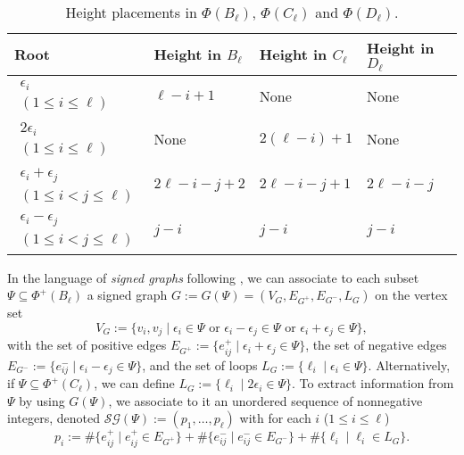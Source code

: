 \documentclass[12pt]{amsart}
\theoremstyle{plain}
\theoremstyle{definition}
\theoremstyle{remark}
\newcommand{\SG}{{\mathcal{SG}}}
\begin{document}
 \begin{table}[htbp]
\centering
{\footnotesize\renewcommand{} 
\begin{tabular}{K{2.5cm}|K{2.5cm}|K{2.5cm}|K{2.5cm}}
Root & Height in $B_\ell$ & Height in $C_\ell$ & Height in $D_\ell$ \\
\hline\hline
$\begin{array}{c}
     \epsilon_i    \\
    (1 \le i \le \ell)
    \end{array}$
& $\ell-i+1$ &None &None \\
\hline
$\begin{array}{c}
     2\epsilon_i    \\
    (1 \le i \le \ell)
    \end{array}$
& None &$2(\ell-i)+1$ &None \\
\hline
$\begin{array}{c}
     \epsilon_i + \epsilon_j\\
    (1 \le i < j \le \ell)
    \end{array}$
& $2\ell-i-j+2$ & $2\ell-i-j+1$ &$2\ell-i-j$ \\
\hline
$\begin{array}{c}
     \epsilon_i - \epsilon_j  \\
    (1 \le i<j \le \ell)
    \end{array}$
& $j-i$ & $j-i$ &$j-i$
\end{tabular}
}
\bigskip
\caption{Height placements in $\Phi(B_\ell)$, $\Phi(C_\ell)$ and $\Phi(D_\ell)$.}
\label{tab:placement}
\end{table}

 
In the language of \emph{signed graphs} following \cite[\S5]{Z81}, we can associate to each subset $\Psi\subseteq\Phi^+(B_\ell)$ a signed graph $G:=G(\Psi)=(V_G, E_{G^+},E_{G^-},L_G)$ on the vertex set 
$$V_G:=\{v_i,v_j \mid \mbox{$\epsilon_i  \in \Psi$ or $\epsilon_i-\epsilon_{j} \in \Psi$ or $\epsilon_i+\epsilon_{j} \in \Psi$} \},$$ with the set of positive edges $E_{G^+}:=\{e_{ij}^+ \mid \epsilon_i + \epsilon_{j} \in \Psi\}$, the set of negative edges $E_{G^-}:=\{e_{ij}^- \mid \epsilon_i - \epsilon_{j} \in \Psi\}$, and the set of loops $L_G:=\{\ell_i \mid \epsilon_i \in \Psi\}$. 
Alternatively, if $\Psi\subseteq\Phi^+(C_\ell)$, we can define $L_G:=\{\ell_i \mid 2\epsilon_i \in \Psi\}$. 
To extract information from $\Psi$ by using $G(\Psi)$, we associate to it an unordered sequence of nonnegative integers, denoted $\SG(\Psi):=(p_1,\ldots,p_\ell)$ with for each $i$ ($1 \le i \le \ell$)
\begin{equation*}\label{eq:di-signed-graphs}
p_i :=\# \{e_{ij}^+ \mid e_{ij}^+ \in E_{G^+}\}+ \# \{e_{ij}^- \mid e_{ij}^- \in E_{G^-}\} + \# \{\ell_{i} \mid \ell_{i} \in L_{G}\}.
\end{equation*} 
\end{document}
